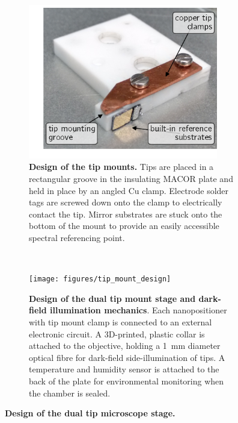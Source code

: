 \documentclass{article}
\begin{document}
\begin{figure}[tb]
\centering
\begin{subfigure}[t]{0.43\textwidth}
	\centering
	\includegraphics[width=0.91\textwidth, clip=true, trim=15 10 0 0]{figures/tip_mount}
	\caption[Design of the tip mounts]{\textbf{Design of the tip mounts.} Tips are placed in a rectangular groove in the insulating MACOR plate and held in place by an angled Cu clamp. Electrode solder tags are screwed down onto the clamp to electrically contact the tip. Mirror substrates are stuck onto the bottom of the mount to provide an easily accessible spectral referencing point.}
	\label{fig:tip_mount}
\end{subfigure}
~
\begin{subfigure}[t]{0.54\textwidth}
	\centering
	\texttt{[image: figures/tip\_mount\_design]}
	\caption[Design of the dual tip mount stage and dark-field illumination mechanics]{\textbf{Design of the dual tip mount stage and dark-field illumination mechanics}. Each nanopositioner with tip mount clamp is connected to an external electronic circuit. A 3D-printed, plastic collar is attached to the objective, holding a \SI{1}{mm} diameter optical fibre for dark-field side-illumination of tips. A temperature and humidity sensor is attached to the back of the plate for environmental monitoring when the chamber is sealed.}
	\label{fig:tip_mount_design}
\end{subfigure}
\caption[Design of the dual tip microscope stage]{\textbf{Design of the dual tip microscope stage.}}
\end{figure}
\end{document}
